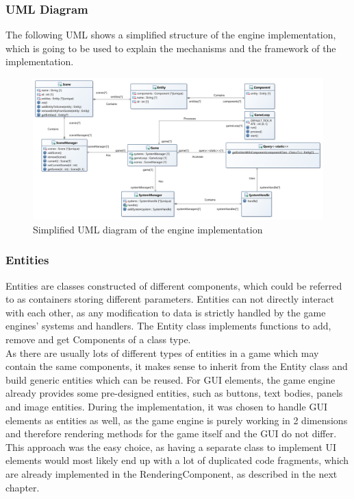 \subsubsection{UML Diagram}\label{subsubsec:uml-diagram}
The following UML shows a simplified structure of the engine implementation, which is going to be used to explain the mechanisms
and the framework of the implementation.
\begin{figure}
    \centering
    \includegraphics[width=1.0\textwidth]{./Pictures/res/implementation/ecs-uml}
    \caption{Simplified UML diagram of the engine implementation}
    \label{fig:ecs-block-diagram}
\end{figure}

\subsubsection{Entities}\label{subsubsec:entities}
Entities are classes constructed of different components, which could be referred to as containers storing different parameters.
Entities can not directly interact with each other, as any modification to data is strictly handled by the game engines' systems and handlers.
The Entity class implements functions to add, remove and get Components of a class type.
\\
As there are usually lots of different types of entities in a game which may contain the same components, it makes sense to inherit from the Entity class and
build generic entities which can be reused.
For GUI elements, the game engine already provides some pre-designed entities, such as buttons, text bodies, panels and image entities.
During the implementation, it was chosen to handle GUI elements as entities as well, as the game engine is purely working in 2 dimensions and therefore
rendering methods for the game itself and the GUI do not differ.
This approach was the easy choice, as having a separate class to implement UI elements would most likely end up with a lot of duplicated
code fragments, which are already implemented in the RenderingComponent, as described in the next chapter.

